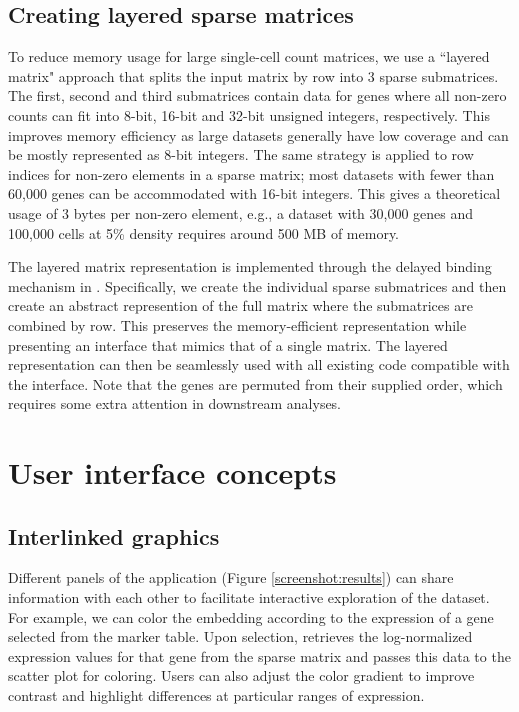 \documentclass{article}
\begin{document}
\subsection{Creating layered sparse matrices}

To reduce memory usage for large single-cell count matrices, we use a ``layered matrix" approach that splits the input matrix by row into 3 sparse submatrices.
The first, second and third submatrices contain data for genes where all non-zero counts can fit into 8-bit, 16-bit and 32-bit unsigned integers, respectively.
This improves memory efficiency as large datasets generally have low coverage and can be mostly represented as 8-bit integers.
The same strategy is applied to row indices for non-zero elements in a sparse matrix; most datasets with fewer than 60,000 genes can be accommodated with 16-bit integers.
This gives a theoretical usage of 3 bytes per non-zero element, e.g., a dataset with 30,000 genes and 100,000 cells at 5\% density requires around 500 MB of memory.

The layered matrix representation is implemented through the delayed binding mechanism in .
Specifically, we create the individual sparse submatrices and then create an abstract represention of the full matrix where the submatrices are combined by row.
This preserves the memory-efficient representation while presenting an interface that mimics that of a single matrix.
The layered representation can then be seamlessly used with all existing code compatible with the  interface.
Note that the genes are permuted from their supplied order, which requires some extra attention in downstream analyses.


\section{User interface concepts}

\subsection{Interlinked graphics}

Different panels of the  application (Figure \ref{screenshot:results}) can share information with each other to facilitate interactive exploration of the dataset.
For example, we can color the embedding according to the expression of a gene selected from the marker table.
Upon selection,  retrieves the log-normalized expression values for that gene from the sparse matrix and passes this data to the scatter plot for coloring.
Users can also adjust the color gradient to improve contrast and highlight differences at particular ranges of expression.
\end{document}
